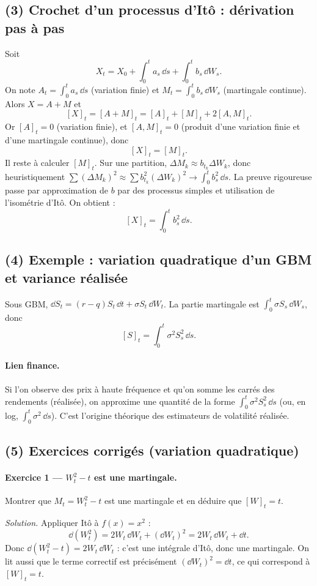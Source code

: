 \subsection*{(3) Crochet d'un processus d'Itô : dérivation pas à pas}
Soit
\[
X_t=X_0+\int_0^t a_s\,\dd s+\int_0^t b_s\,\dd W_s.
\]
On note $A_t=\int_0^t a_s\,\dd s$ (variation finie) et $M_t=\int_0^t b_s\,\dd W_s$ (martingale continue).
Alors $X=A+M$ et
\[
[X]_t=[A+M]_t=[A]_t+[M]_t+2[A,M]_t.
\]
Or $[A]_t=0$ (variation finie), et $[A,M]_t=0$ (produit d'une variation finie et d'une martingale continue), donc
\[
[X]_t=[M]_t.
\]
Il reste à calculer $[M]_t$.
Sur une partition, $\Delta M_k\approx b_{t_k}\Delta W_k$, donc heuristiquement
$\sum (\Delta M_k)^2\approx \sum b_{t_k}^2(\Delta W_k)^2\to \int_0^t b_s^2\,\dd s$.
La preuve rigoureuse passe par approximation de $b$ par des processus simples et utilisation de l'isométrie d'Itô.
On obtient :
\[
\boxed{[X]_t=\int_0^t b_s^2\,\dd s.}
\]

\subsection*{(4) Exemple : variation quadratique d'un GBM et variance réalisée}
Sous GBM, $\dd S_t=(r-q)S_t\,\dd t+\sigma S_t\,\dd W_t$.
La partie martingale est $\int_0^t \sigma S_s\,\dd W_s$, donc
\[
[S]_t=\int_0^t \sigma^2 S_s^2\,\dd s.
\]
\paragraph{Lien finance.}
Si l'on observe des prix à haute fréquence et qu'on somme les carrés des rendements (réalisée),
on approxime une quantité de la forme $\int_0^t \sigma^2 S_s^2\,\dd s$ (ou, en log, $\int_0^t \sigma^2\,\dd s$).
C'est l'origine théorique des estimateurs de volatilité réalisée.

\subsection*{(5) Exercices corrigés (variation quadratique)}
\paragraph{Exercice 1 --- $W_t^2-t$ est une martingale.}
Montrer que $M_t=W_t^2-t$ est une martingale et en déduire que $[W]_t=t$.

\emph{Solution.}
Appliquer Itô à $f(x)=x^2$ :
\[
\dd(W_t^2)=2W_t\,\dd W_t+(\dd W_t)^2=2W_t\,\dd W_t+\dd t.
\]
Donc $\dd(W_t^2-t)=2W_t\,\dd W_t$ : c'est une intégrale d'Itô, donc une martingale.
On lit aussi que le terme correctif est précisément $(\dd W_t)^2=\dd t$, ce qui correspond à $[W]_t=t$.

